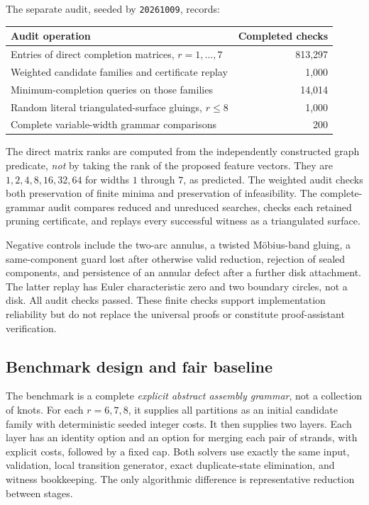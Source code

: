 \documentclass[11pt,a4paper]{article}
\theoremstyle{definition}
\theoremstyle{remark}
\begin{document}
The separate audit, seeded by \texttt{20261009}, records:
\begin{center}
\begin{tabular}{p{}r}
\toprule
Audit operation & Completed checks\\\midrule
Entries of direct completion matrices, $r=1,\ldots,7$ & 813,297\\
Weighted candidate families and certificate replay & 1,000\\
Minimum-completion queries on those families & 14,014\\
Random literal triangulated-surface gluings, $r\le8$ & 1,000\\
Complete variable-width grammar comparisons & 200\\\bottomrule
\end{tabular}
\end{center}
The direct matrix ranks are computed from the independently constructed graph
predicate, \emph{not} by taking the rank of the proposed feature vectors. They are
$1,2,4,8,16,32,64$ for widths $1$ through $7$, as predicted. The weighted audit
checks both preservation of finite minima and preservation of infeasibility. The
complete-grammar audit compares reduced and unreduced searches, checks each retained
pruning certificate, and replays every successful witness as a triangulated surface.

Negative controls include the two-arc annulus, a twisted M\"obius-band gluing,
a same-component guard lost after otherwise valid reduction, rejection of sealed
components, and persistence of an annular defect after a further disk attachment.
The latter replay has Euler characteristic zero and two boundary circles, not a disk.
All audit checks passed. These finite checks support implementation reliability but
do not replace the universal proofs or constitute proof-assistant verification.

\subsection{Benchmark design and fair baseline}
The benchmark is a complete \emph{explicit abstract assembly grammar}, not a collection
of knots. For each $r=6,7,8$, it supplies all partitions as an initial candidate family
with deterministic seeded integer costs. It then supplies two layers. Each layer has
an identity option and an option for merging each pair of strands, with explicit costs,
followed by a fixed cap. Both solvers use exactly the same input, validation, local
transition generator, exact duplicate-state elimination, and witness bookkeeping.
The only algorithmic difference is representative reduction between stages.
\end{document}
